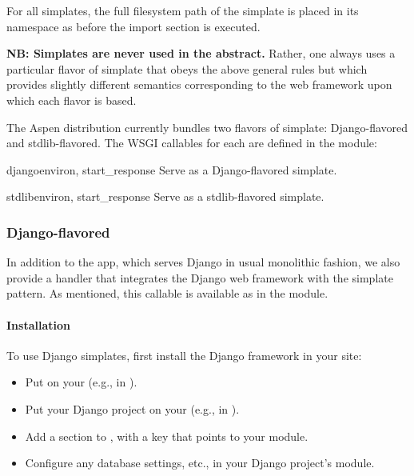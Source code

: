 For all simplates, the full filesystem path of the simplate is placed in its
namespace as  before the import section is executed.

\textbf{NB: Simplates are never used in the abstract.} Rather, one always uses a
particular flavor of simplate that obeys the above general rules but which
provides slightly different semantics corresponding to the web framework upon
which each flavor is based.

The Aspen distribution currently bundles two flavors
of simplate: Django-flavored and stdlib-flavored. The WSGI callables for each
are defined in the  module:

\begin{funcdesc}{django}{environ, start_response} Serve
 as a Django-flavored simplate.\end{funcdesc}

\begin{funcdesc}{stdlib}{environ, start_response} Serve
 as a stdlib-flavored simplate.\end{funcdesc}



\subsubsection{Django-flavored}

In addition to the  app, which serves Django in usual
monolithic fashion, we also provide a handler that integrates the Django web
framework with the simplate pattern. As mentioned, this callable is available as
 in the  module.


\paragraph{Installation}

To use Django simplates, first install the Django framework in your site:

\begin{itemize}
\item{Put  on your  (e.g., in ).}
\item{Put your Django project on your  (e.g., in ).}
\item{Add a \code{[django]} section to , with a  key that points to your  module.}
\item{Configure any database settings, etc., in your Django project's  module.}
\end{itemize}

